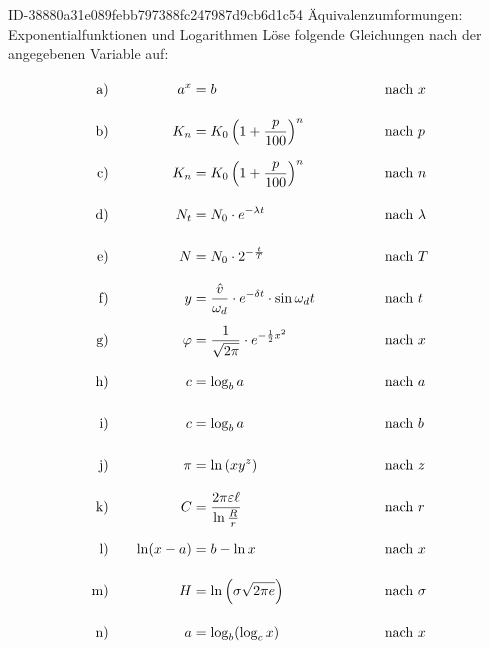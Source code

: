 \begin{exercise}
      {ID-38880a31e089febb797388fc247987d9cb6d1c54}
      {Äquivalenzumformungen: Exponentialfunktionen und Logarithmen}
  \ifproblem\problem
    \newcommand{\exnum}[1]{\text{\rule[-2.5ex]{0pt}{6ex}#1}}
    Löse folgende Gleichungen nach der angegebenen Variable auf:
    \allowdisplaybreaks
    \begin{alignat*}{4}
      \exnum{a)}&\quad &    a^{x}&=b                                                                 & \quad&\quad & \quad&\text{nach $x$}       \\
      \exnum{b)}&\quad &    K_{n}&=K_{0}\left(1+\frac{p}{100}\right)^{n}                             & \quad&\quad & \quad&\text{nach $p$}       \\
      \exnum{c)}&\quad &    K_{n}&=K_{0}\left(1+\frac{p}{100}\right)^{n}                             & \quad&\quad & \quad&\text{nach $n$}       \\
      \exnum{d)}&\quad &    N_{t}&=N_{0}\cdot e^{-\lambda t}                                         & \quad&\quad & \quad&\text{nach $\lambda$} \\
      \exnum{e)}&\quad &        N&=N_{0}\cdot2^{-\frac{t}{T}}                                        & \quad&\quad & \quad&\text{nach $T$}       \\
      \exnum{f)}&\quad &        y&=\frac{\hat{v}}{\omega_{d}}\cdot e^{-\delta t}\cdot\sin\omega_{d}t & \quad&\quad & \quad&\text{nach $t$}       \\
      \exnum{g)}&\quad &  \varphi&=\frac{1}{\sqrt{2\pi}}\cdot e^{-\frac{1}{2}x^{2}}                  & \quad&\quad & \quad&\text{nach $x$}       \\
      \exnum{h)}&\quad &        c&=\log_{b}a                                                         & \quad&\quad & \quad&\text{nach $a$}       \\
      \exnum{i)}&\quad &        c&=\log_{b}a                                                         & \quad&\quad & \quad&\text{nach $b$}       \\
      \exnum{j)}&\quad &      \pi&=\ln\left(xy^{z}\right)                                            & \quad&\quad & \quad&\text{nach $z$}       \\
      \exnum{k)}&\quad &        C&=\frac{2\pi\varepsilon\ell}{\ln\frac{R}{r}}                        & \quad&\quad & \quad&\text{nach $r$}       \\
      \exnum{l)}&\quad & \ln(x-a)&=b-\ln x                                                           & \quad&\quad & \quad&\text{nach $x$}       \\
      \exnum{m)}&\quad &        H&=\ln\left(\sigma\sqrt{2\pi e}\right)                               & \quad&\quad & \quad&\text{nach $\sigma$}  \\
      \exnum{n)}&\quad &        a&=\log_{b}(\log_{c}x)                                               & \quad&\quad & \quad&\text{nach $x$}
    \end{alignat*}
  \fi
\end{exercise}
